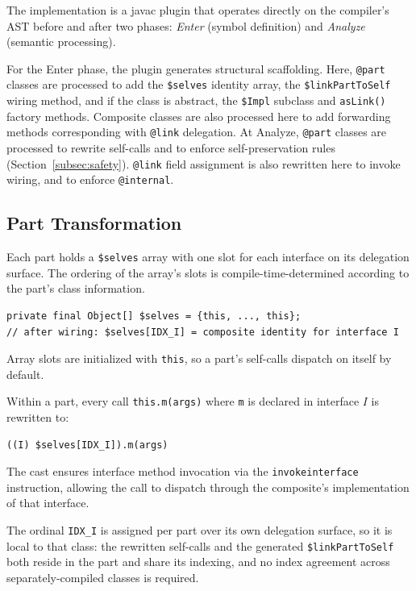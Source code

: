 \documentclass[acmsmall,nonacm]{acmart}
\theoremstyle{acmplain}
\newcommand{\code}[1]{\texttt{#1}}
\begin{document}
The implementation is a javac plugin that operates directly on the compiler's AST before and after two phases: \emph{Enter}
(symbol definition) and \emph{Analyze} (semantic processing).

For the Enter phase, the plugin generates structural scaffolding. Here, \code{@part} classes are processed to add
the \code{\$selves} identity array, the \code{\$linkPartToSelf} wiring method, and if the class is abstract, the \code{\$Impl}
subclass and \code{asLink()} factory methods. Composite classes are also processed here to add forwarding methods corresponding
with \code{@link} delegation. At Analyze, \code{@part} classes are processed to rewrite self-calls and to enforce self-preservation
rules (Section~\ref{subsec:safety}). \code{@link} field assignment is also rewritten here to invoke wiring, and to enforce \code{@internal}.

\subsection{Part Transformation}

Each part holds a \code{\$selves} array with one slot for each interface on its delegation surface. The ordering of the
array's slots is compile-time-determined according to the part's class information.

\begin{lstlisting}[language={},style=java]
private final Object[] $selves = {this, ..., this};
// after wiring: $selves[IDX_I] = composite identity for interface I
\end{lstlisting}

Array slots are initialized with \code{this}, so a part's self-calls dispatch on itself by default.

Within a part, every call \code{this.m(args)} where \code{m} is declared in interface $I$ is rewritten to:

\begin{lstlisting}
((I) $selves[IDX_I]).m(args)
\end{lstlisting}

The cast ensures interface method invocation via the \code{invokeinterface} instruction, allowing the call to dispatch through
the composite's implementation of that interface.

The ordinal \code{IDX\_I} is assigned per part over its own delegation surface, so it is local to that class: the rewritten
self-calls and the generated \code{\$linkPartToSelf} both reside in the part and share its indexing, and no index agreement
across separately-compiled classes is required.
\end{document}
